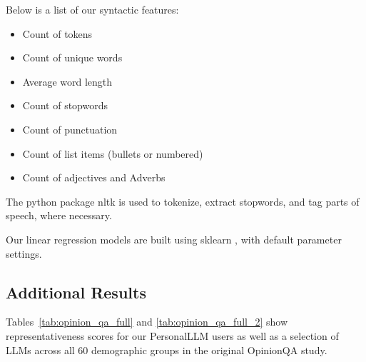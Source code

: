 Below is a list of our syntactic features:
\begin{itemize}
    \item Count of tokens
    \item Count of unique words
    \item Average word length
    \item Count of stopwords
    \item Count of punctuation
    \item Count of list items (bullets or numbered)
    \item Count of adjectives and Adverbs
\end{itemize}
The python package nltk \citep{bird-loper-2004-nltk} is used to tokenize, extract stopwords, and tag parts of speech, where necessary.

Our linear regression models are built using sklearn \citep{scikit-learn}, with default parameter settings.

\subsection{Additional Results}\label{app:user_results}

Tables~\ref{tab:opinion_qa_full} and \ref{tab:opinion_qa_full_2} show representativeness scores for our PersonalLLM users as well as a selection of LLMs across all 60 demographic groups in the original OpinionQA \citep{santurkar2023opinions} study.

